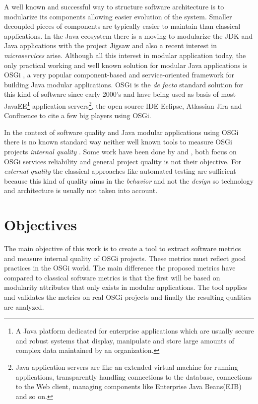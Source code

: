 A well known and successful way to structure software architecture is to modularize its components allowing easier evolution of the system. Smaller decoupled pieces of components are typically easier to maintain than classical applications. In the Java ecosystem there is a moving to modularize the JDK and Java applications with the project Jigsaw \citep{Krill 2012} and also a recent interest in \emph{microservices} \citep{Knorr 2014} arise. Although all this interest in modular application today, the only practical working and well known solution for modular Java applications is OSGi \citep{Hall 2011}, a very popular component-based and service-oriented framework for building Java modular applications. OSGi is the \emph{de facto} standard solution for this kind of software since early 2000's and have being used as basis of most JavaEE\footnote{A Java platform dedicated for enterprise applications which are usually secure and robust systems that display, manipulate and store large amounts of complex data maintained by an organization.} application servers\footnote{Java application servers are like an extended virtual machine for running applications, transparently handling connections to the database, connections to the Web client, managing components like Enterprise Java Beans(EJB) and so on.}, the open source IDE Eclipse\citep{eclipse 2006}, Atlassian Jira and Confluence to cite a few big players using OSGi. 

In the context of software quality and Java modular applications using OSGi there is no known standard way neither well known tools to measure OSGi projects \textit{internal quality} \citep{Hamza 2013} \citep{Wang 2012}. Some work have been done by \citep{Gama 2012} and \citep{Wang 2012}, both focus on OSGi services reliability and general project quality is not their objective. For \emph{external quality} the classical approaches like automated testing are sufficient because this kind of quality aims in the \emph{behavior} and not the \emph{design} so technology and architecture is usually not taken into account.

        
\section{Objectives}
The main objective of this work is to create a tool to extract software metrics and measure internal quality of OSGi projects. These metrics must reflect good practices in the OSGi world. The main difference the proposed metrics have compared to classical software metrics is that the first will be based on modularity attributes that only exists in modular applications. The tool applies and validates the metrics on real OSGi projects and finally the resulting qualities are analyzed.  

